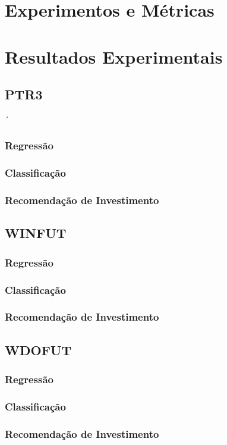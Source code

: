 \section{Experimentos e Métricas}
\label{sec:experimentos _metricas}

\section{Resultados Experimentais}
\label{sec:resultados_experimentais}
\subsection{PTR3}´
\subsubsection{Regressão}
\subsubsection{Classificação}
\subsubsection{Recomendação de Investimento}
\subsection{WINFUT}
\subsubsection{Regressão}
\subsubsection{Classificação}
\subsubsection{Recomendação de Investimento}
\subsection{WDOFUT}
\subsubsection{Regressão}
\subsubsection{Classificação}
\subsubsection{Recomendação de Investimento}



